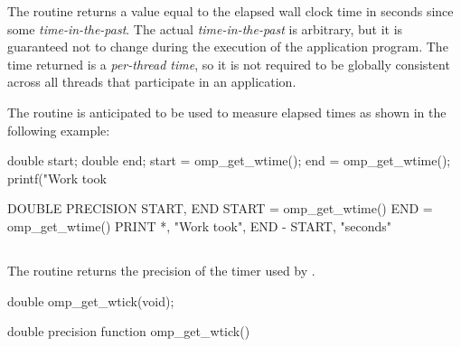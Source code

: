 \effect
The  routine returns a value equal to the elapsed 
wall clock time in seconds since some \emph{time-in-the-past}. The actual 
\emph{time-in-the-past} is arbitrary, but it is guaranteed not to change 
during the execution of the application program. The time returned is 
a \emph{per-thread time}, so it is not required to be globally consistent 
across all threads that participate in an application.

\begin{note}
The routine is anticipated to be used to measure elapsed times as shown
in the following example:

\begin{ccppspecific}
\begin{ompcFunction}
double start;
double end;
start = omp_get_wtime();
end = omp_get_wtime();
printf("Work took %
\end{ompcFunction}
\end{ccppspecific}

\begin{fortranspecific}
\begin{ompcFunction}
DOUBLE PRECISION START, END
START = omp_get_wtime()
END = omp_get_wtime()
PRINT *, "Work took", END - START, "seconds"
\end{ompcFunction}
\end{fortranspecific}
\end{note}



\subsection{}
\label{subsec:omp_get_wtick}
\summary
The  routine returns the precision of the timer used 
by .

\format
\begin{ccppspecific}
\begin{ompcFunction}
double omp_get_wtick(void);
\end{ompcFunction}
\end{ccppspecific}

\begin{fortranspecific}
\begin{ompfFunction}
double precision function omp_get_wtick()
\end{ompfFunction}
\end{fortranspecific}

